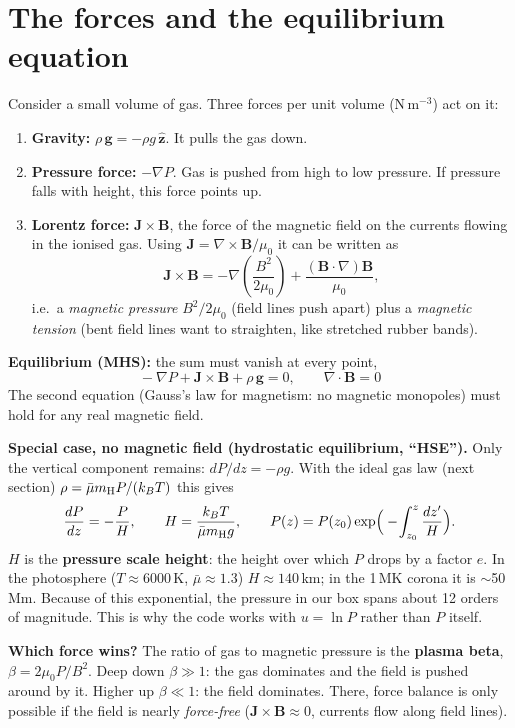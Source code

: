 \documentclass[10pt]{extarticle}
\newcommand{\B}{\mathbf B}\newcommand{\J}{\mathbf J}\newcommand{\Bo}{\mathbf B_{\rm obs}}
\begin{document}
\section{The forces and the equilibrium equation}
Consider a small volume of gas. Three forces per unit volume (N\,m$^{-3}$) act on it:
\begin{enumerate}
\item \textbf{Gravity:} $\rho\,\mathbf g=-\rho g\,\hat{\mathbf z}$. It pulls the gas down.
\item \textbf{Pressure force:} $-\nabla P$. Gas is pushed from high to low pressure. If pressure falls with height, this force points up.
\item \textbf{Lorentz force:} $\J\times\B$, the force of the magnetic field on the currents flowing in the ionised gas. Using $\J=\nabla\times\B/\mu_0$ it can be written as
\[
\J\times\B=-\nabla\!\left(\frac{B^2}{2\mu_0}\right)+\frac{(\B\cdot\nabla)\B}{\mu_0},
\]
i.e.\ a \emph{magnetic pressure} $B^2/2\mu_0$ (field lines push apart) plus a \emph{magnetic tension} (bent field lines want to straighten, like stretched rubber bands).
\end{enumerate}
\textbf{Equilibrium (MHS):} the sum must vanish at every point,
\[
\boxed{\;-\nabla P+\J\times\B+\rho\,\mathbf g=0,\qquad \nabla\cdot\B=0\;}
\]
The second equation (Gauss's law for magnetism: no magnetic monopoles) must hold for any real magnetic field.

\textbf{Special case, no magnetic field (hydrostatic equilibrium, ``HSE'').} Only the vertical component remains: $dP/dz=-\rho g$. With the ideal gas law (next section) $\rho=\bar\mu m_{\rm H}P/(k_BT)$ this gives
\[
\frac{dP}{dz}=-\frac{P}{H},\qquad H=\frac{k_BT}{\bar\mu m_{\rm H}g},\qquad P(z)=P(z_0)\exp\!\Big(-\!\int_{z_0}^{z}\frac{dz'}{H}\Big).
\]
$H$ is the \textbf{pressure scale height}: the height over which $P$ drops by a factor $e$. In the photosphere ($T\approx6000$\,K, $\bar\mu\approx1.3$) $H\approx140$\,km; in the 1\,MK corona it is $\sim$50\,Mm. Because of this exponential, the pressure in our box spans about 12 orders of magnitude. This is why the code works with $u=\ln P$ rather than $P$ itself.

\textbf{Which force wins?} The ratio of gas to magnetic pressure is the \textbf{plasma beta}, $\beta=2\mu_0P/B^2$. Deep down $\beta\gg1$: the gas dominates and the field is pushed around by it. Higher up $\beta\ll1$: the field dominates. There, force balance is only possible if the field is nearly \emph{force-free} ($\J\times\B\approx0$, currents flow along field lines).
\end{document}

